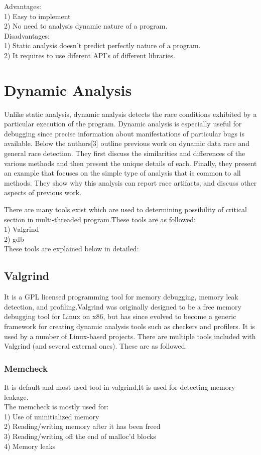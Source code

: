 Advantages:\\
1) Easy to implement\\
2) No need to analysis dynamic nature of a program.\\
Disadvantages:\\
1) Static analysis doesn't predict perfectly nature of a program.\\
2) It requires to use diferent API's of different libraries.\\

\section{Dynamic Analysis}
Unlike static analysis, dynamic analysis detects the race conditions exhibited by a particular execution of the program. Dynamic analysis is especially useful for debugging since precise information about manifestations of particular bugs is available. Below the authors[3] outline previous work on dynamic data race and general race detection. They first discuss the similarities and differences of the various methods and then present the unique details of each. Finally, they present an example that focuses on the simple type of analysis that is common to all methods. They show why this analysis can report race artifacts, and discuss other aspects of previous work.

There are many tools exist which are used to determining possibility of critical section in multi-threaded program.These tools are as followed:\\
1) Valgrind\\
2) gdb\\

These tools are explained below in detailed:
\newpage
\subsection{Valgrind}
It is a GPL licensed programming tool for memory debugging, memory leak detection, and profiling.Valgrind was originally designed to be a free memory debugging tool for Linux on x86, but has since evolved to become a generic framework for creating dynamic analysis tools such as checkers and profilers. It is used by a number of Linux-based projects.
There are multiple tools included with Valgrind (and several external ones). These are as followed. 

\subsubsection{Memcheck}
It is default and most used tool in valgrind,It is used for detecting memory leakage.\\
The memcheck is mostly used for:\\
1) Use of uninitialized memory \\
2) Reading/writing memory after it has been freed \\
3) Reading/writing off the end of malloc'd blocks \\
4) Memory leaks

